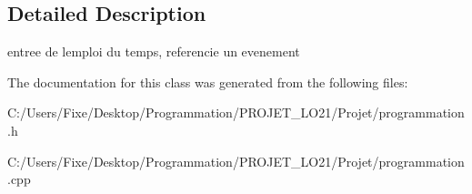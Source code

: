 \subsection{Detailed Description}
entree de l\textquotesingle{}emploi du temps, referencie un evenement 

The documentation for this class was generated from the following files\+:\begin{DoxyCompactItemize}
\item 
C\+:/\+Users/\+Fixe/\+Desktop/\+Programmation/\+P\+R\+O\+J\+E\+T\+\_\+\+L\+O21/\+Projet/programmation.\+h\item 
C\+:/\+Users/\+Fixe/\+Desktop/\+Programmation/\+P\+R\+O\+J\+E\+T\+\_\+\+L\+O21/\+Projet/programmation.\+cpp\end{DoxyCompactItemize}
